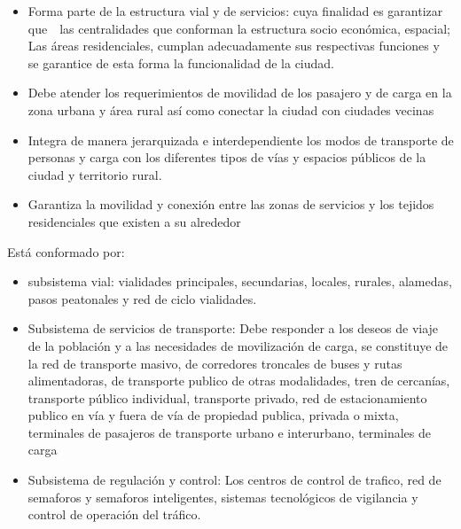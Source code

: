 \documentclass[10pt]{article}
\begin{document}
\begin{itemize}
	\item Forma parte de la estructura vial y de servicios: cuya finalidad es garantizar
	que  las centralidades que conforman la estructura socio económica, espacial; Las
	áreas residenciales, cumplan adecuadamente sus respectivas funciones y se
	garantice de esta forma la funcionalidad de la ciudad.
	\item Debe atender los requerimientos de movilidad de los pasajero y de carga en la zona urbana y área rural así como conectar la ciudad con ciudades vecinas
	\item Integra de manera jerarquizada e interdependiente los modos de transporte de personas y carga con los diferentes tipos de vías y espacios públicos de la ciudad y territorio rural.
	\item Garantiza la movilidad y conexión entre las zonas de servicios y los tejidos residenciales que existen a su alrededor
	 
\end{itemize}

Está conformado por:

\begin{itemize}
\item subsistema vial: vialidades principales, secundarias, locales, rurales, alamedas, pasos peatonales y red de ciclo vialidades.
\item Subsistema de servicios de transporte: Debe responder a los deseos de viaje de la población y a las necesidades de movilización de carga, se constituye de la red de transporte masivo, de corredores troncales de buses y rutas alimentadoras, de transporte publico de otras modalidades, tren de cercanías, transporte público individual, transporte privado, red de estacionamiento publico en vía y fuera de vía de propiedad publica, privada o mixta, terminales de pasajeros de transporte urbano e interurbano, terminales de carga
\item Subsistema de regulación y control: Los centros de control de trafico, red de semaforos y semaforos inteligentes, sistemas tecnológicos de vigilancia y control de operación del tráfico. 

\end{itemize}
\end{document}
